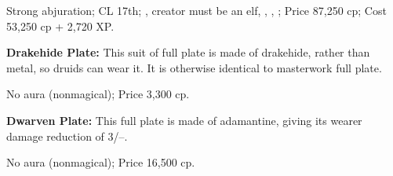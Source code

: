 Strong abjuration; CL 17th; , creator must be an elf, , , ; Price 87,250 cp; Cost 53,250 cp + 2,720 XP.

\textbf{Drakehide Plate:} This suit of full plate is made of drakehide, rather than metal, so druids can wear it. It is otherwise identical to masterwork full plate.

No aura (nonmagical); Price 3,300 cp.

\textbf{Dwarven Plate:} This full plate is made of adamantine, giving its wearer damage reduction of 3/--.

No aura (nonmagical); Price 16,500 cp.
